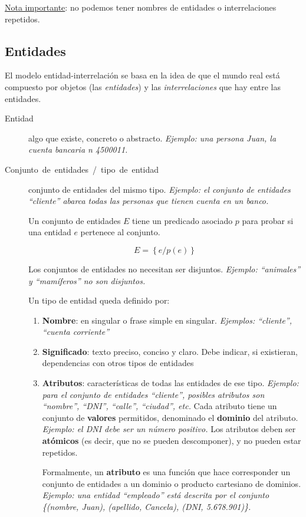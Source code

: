\documentclass[a4paper, twoside]{article}
\begin{document}
\uline{Nota importante}: no podemos tener nombres de entidades
o interrelaciones repetidos.


\subsection{Entidades}

El modelo entidad-interrelación se basa en la idea de que el mundo
real está compuesto por objetos (las \emph{entidades}) y las \emph{interrelaciones}
que hay entre las entidades.
\begin{description}
\item [{Entidad}] algo que existe, concreto o abstracto. \emph{Ejemplo:
una persona Juan, la cuenta bancaria n\textdegree{} 4500011.}
\item [{Conjunto~de~entidades~/~tipo~de~entidad}] conjunto de entidades
del mismo tipo. \emph{Ejemplo: el conjunto de entidades ``cliente''
abarca todas las personas que tienen cuenta en un banco.}


Un conjunto de entidades $E$ tiene un predicado asociado $p$ para
probar si una entidad $e$ pertenece al conjunto.


\[
E=\left\{ e/p(e)\right\} 
\]



Los conjuntos de entidades no necesitan ser disjuntos. \emph{Ejemplo:
``animales'' y ``mamíferos'' no son disjuntos.}


Un tipo de entidad queda definido por:
\begin{enumerate}
\item \textbf{Nombre}: en singular o frase simple en singular. \emph{Ejemplos:
``cliente'', ``cuenta corriente''}
\item \textbf{Significado}: texto preciso, conciso y claro. Debe indicar,
si existieran, dependencias con otros tipos de entidades
\item \textbf{Atributos}: características de todas las entidades de ese
tipo. \emph{Ejemplo: para el conjunto de entidades ``cliente'',
posibles atributos son ``nombre'', ``DNI'', ``calle'', ``ciudad'',
etc. }Cada atributo tiene un conjunto de \textbf{valores} permitidos,
denominado el \textbf{dominio }del atributo. \emph{Ejemplo: el DNI
debe ser un número positivo. }Los atributos deben ser \textbf{atómicos}
(es decir, que no se pueden descomponer), y no pueden estar repetidos.


Formalmente, un \textbf{atributo} es una función que hace corresponder
un conjunto de entidades a un dominio o producto cartesiano de dominios.
\emph{Ejemplo: una entidad ``empleado'' está descrita por el conjunto
\{(nombre, Juan), (apellido, Cancela), (DNI, 5.678.901)\}.}



\end{enumerate}
\end{description}
\end{document}
